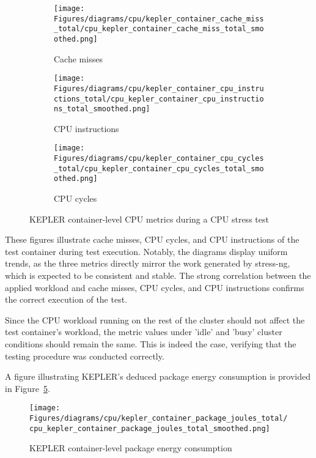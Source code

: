 \begin{figure}[H]
    \centering
    \begin{subfigure}{0.49\textwidth}
        \texttt{[image: Figures/diagrams/cpu/kepler\_container\_cache\_miss\_total/cpu\_kepler\_container\_cache\_miss\_total\_smoothed.png]}
        \caption{Cache misses}
        \label{fig:cpu_kepler_container_cache_miss_total}
    \end{subfigure}
    \begin{subfigure}{0.49\textwidth}
        \texttt{[image: Figures/diagrams/cpu/kepler\_container\_cpu\_instructions\_total/cpu\_kepler\_container\_cpu\_instructions\_total\_smoothed.png]}
        \caption{CPU instructions}
        \label{fig:cpu_kepler_container_cpu_instructions_total}
    \end{subfigure}
    \begin{subfigure}{1\textwidth}
        \texttt{[image: Figures/diagrams/cpu/kepler\_container\_cpu\_cycles\_total/cpu\_kepler\_container\_cpu\_cycles\_total\_smoothed.png]}
        \caption{CPU cycles}
        \label{fig:cpu_kepler_container_cpu_cycles_total}
    \end{subfigure}
    \caption[Container-Level CPU Metrics]{KEPLER container-level CPU metrics during a CPU stress test}
\end{figure}

These figures illustrate cache misses, CPU cycles, and CPU instructions of the test container during test execution. Notably, the diagrams display uniform trends, as the three metrics directly mirror the work generated by stress-ng, which is expected to be consistent and stable. The strong correlation between the applied workload and cache misses, CPU cycles, and CPU instructions confirms the correct execution of the test.

Since the CPU workload running on the rest of the cluster should not affect the test container’s workload, the metric values under 'idle' and 'busy' cluster conditions should remain the same. This is indeed the case, verifying that the testing procedure was conducted correctly.

A figure illustrating KEPLER's deduced package energy consumption is provided in Figure~\ref{fig:cpu_kepler_container_package_joules_total}.

\begin{figure}[H]
    \centering
    \texttt{[image: Figures/diagrams/cpu/kepler\_container\_package\_joules\_total/cpu\_kepler\_container\_package\_joules\_total\_smoothed.png]}
    \caption[Container Package Energy]{KEPLER container-level package energy consumption}
    \label{fig:cpu_kepler_container_package_joules_total}
\end{figure}
    
